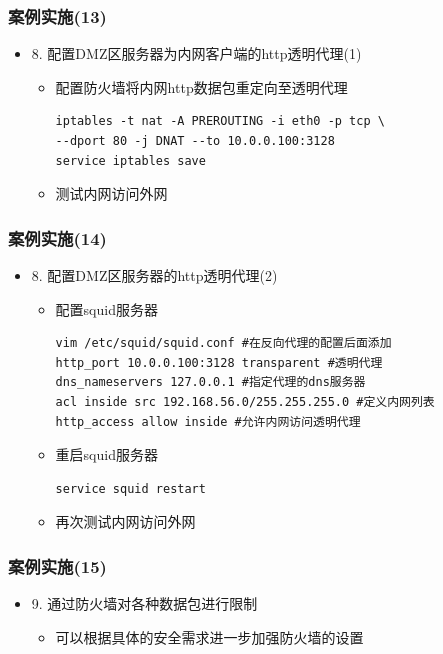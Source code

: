 \documentclass[xcolor=svgnames,presentation]{beamer}
\begin{document}
\begin{frame}[fragile]
\frametitle{案例实施(13)}
\label{sec-5-15}
\begin{itemize}

\item 8. 配置DMZ区服务器为内网客户端的http透明代理(1)
\label{sec-5-15-1}%
\begin{itemize}

\item 配置防火墙将内网http数据包重定向至透明代理\\
\label{sec-5-15-1-1}%
\begin{verbatim}
iptables -t nat -A PREROUTING -i eth0 -p tcp \
--dport 80 -j DNAT --to 10.0.0.100:3128
service iptables save
\end{verbatim}

\item 测试内网访问外网
\label{sec-5-15-1-2}%
\end{itemize} %
\end{itemize} %
\end{frame}
\begin{frame}[fragile]
\frametitle{案例实施(14)}
\label{sec-5-16}
\begin{itemize}

\item 8. 配置DMZ区服务器的http透明代理(2)
\label{sec-5-16-1}%
\begin{itemize}

\item 配置squid服务器\\
\label{sec-5-16-1-1}%
\begin{verbatim}
vim /etc/squid/squid.conf #在反向代理的配置后面添加
http_port 10.0.0.100:3128 transparent #透明代理
dns_nameservers 127.0.0.1 #指定代理的dns服务器
acl inside src 192.168.56.0/255.255.255.0 #定义内网列表
http_access allow inside #允许内网访问透明代理
\end{verbatim}

\item 重启squid服务器\\
\label{sec-5-16-1-2}%
\begin{verbatim}
service squid restart
\end{verbatim}

\item 再次测试内网访问外网
\label{sec-5-16-1-3}%
\end{itemize} %
\end{itemize} %
\end{frame}
\begin{frame}
\frametitle{案例实施(15)}
\label{sec-5-17}
\begin{itemize}

\item 9. 通过防火墙对各种数据包进行限制
\label{sec-5-17-1}%
\begin{itemize}

\item 可以根据具体的安全需求进一步加强防火墙的设置
\label{sec-5-17-1-1}%
\end{itemize} %
\end{itemize} %
\end{frame}
\end{document}
